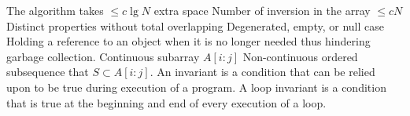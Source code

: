%
%


 The algorithm takes $\leq c \lg N$ extra space
 Number of inversion in the array $\leq cN$
 Distinct properties without total overlapping
 Degenerated, empty, or null case
 Holding a reference to an object when it is no longer needed thus hindering garbage collection. 
 Continuous subarray $A[i:j]$
 Non-continuous ordered subsequence that $S\subset A[i:j]$.
 An invariant is a condition that can be relied upon to be true during execution of a program. A loop invariant is a condition that is true at the beginning and end of every execution of a loop.

